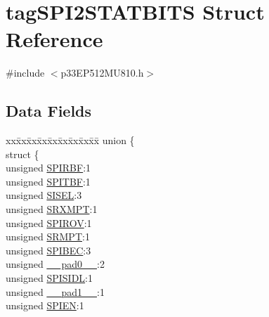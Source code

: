 \hypertarget{structtag_s_p_i2_s_t_a_t_b_i_t_s}{}\section{tag\+S\+P\+I2\+S\+T\+A\+T\+B\+I\+TS Struct Reference}
\label{structtag_s_p_i2_s_t_a_t_b_i_t_s}


{\ttfamily \#include $<$p33\+E\+P512\+M\+U810.\+h$>$}

\subsection*{Data Fields}
\begin{DoxyCompactItemize}
\item 
\begin{tabbing}
xx\=xx\=xx\=xx\=xx\=xx\=xx\=xx\=xx\=\kill
union \{\\
\>struct \{\\
\>\>unsigned \hyperlink{structtag_s_p_i2_s_t_a_t_b_i_t_s_aca81e0734a11061cfacfc4eeab87e4e9}{SPIRBF}:1\\
\>\>unsigned \hyperlink{structtag_s_p_i2_s_t_a_t_b_i_t_s_ad0edcfb75c96ed94138b2b1995ca0a91}{SPITBF}:1\\
\>\>unsigned \hyperlink{structtag_s_p_i2_s_t_a_t_b_i_t_s_a0aae6d6bf32c0591c0771f0947256bbc}{SISEL}:3\\
\>\>unsigned \hyperlink{structtag_s_p_i2_s_t_a_t_b_i_t_s_ac20c62c315f5e27133de699867a5072e}{SRXMPT}:1\\
\>\>unsigned \hyperlink{structtag_s_p_i2_s_t_a_t_b_i_t_s_a53721ff21767e781162f289a006cad5f}{SPIROV}:1\\
\>\>unsigned \hyperlink{structtag_s_p_i2_s_t_a_t_b_i_t_s_a4682f59fe87ae9344722baf5b4e0ab97}{SRMPT}:1\\
\>\>unsigned \hyperlink{structtag_s_p_i2_s_t_a_t_b_i_t_s_a2e2480d221f198907a6594dd78a2a234}{SPIBEC}:3\\
\>\>unsigned \hyperlink{structtag_s_p_i2_s_t_a_t_b_i_t_s_adf71f3d8410c1f1dbbc96680a92c49af}{\_\_pad0\_\_}:2\\
\>\>unsigned \hyperlink{structtag_s_p_i2_s_t_a_t_b_i_t_s_a73d48e3f46331c0141085ce1b20bcda4}{SPISIDL}:1\\
\>\>unsigned \hyperlink{structtag_s_p_i2_s_t_a_t_b_i_t_s_acaf2d0924a107ec6e8d2e31febaf66f9}{\_\_pad1\_\_}:1\\
\>\>unsigned \hyperlink{structtag_s_p_i2_s_t_a_t_b_i_t_s_abfc32d788a158c98350adfdd625de985}{SPIEN}:1\\

\end{tabbing}
\end{DoxyCompactItemize}
